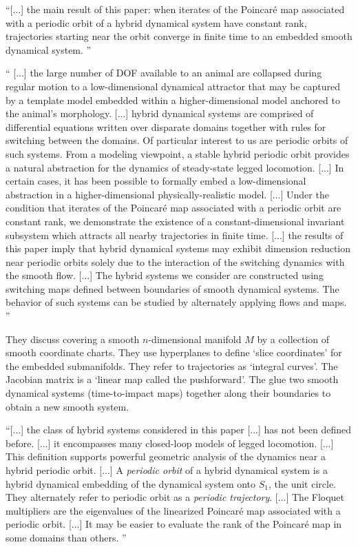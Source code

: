 \begin{description}
``[...]
the main result of this paper: when
iterates of the Poincar\'e map associated with a periodic orbit
of a hybrid dynamical system have constant rank, trajectories
starting near the orbit converge in finite time to an embedded
smooth dynamical system.
''

``
[...]
the large number of DOF available to an animal are collapsed
during regular motion to a low-dimensional dynamical attractor
that may be captured by a template model embedded
within a higher-dimensional model anchored to the animal's
morphology.
[...]
hybrid
dynamical systems are comprised of differential equations
written over disparate domains together with rules for switching
between the domains. Of particular interest to us are
periodic orbits of such systems. From a modeling viewpoint,
a stable hybrid periodic orbit provides a natural abstraction
for the dynamics of steady-state legged locomotion.
[...]
In certain cases, it has
been possible to formally embed a low-dimensional abstraction
in a higher-dimensional physically-realistic model.
[...]
Under the condition that iterates of the Poincar\'e
map associated with a periodic orbit are constant rank,
we demonstrate the existence of a constant-dimensional
invariant subsystem which attracts all nearby trajectories in
finite time.
[...]
the results of this paper
imply that hybrid dynamical systems may exhibit dimension
reduction near periodic orbits solely due to the interaction
of the switching dynamics with the smooth flow.
[...]
The hybrid systems we consider are constructed using
switching maps defined between boundaries of smooth dynamical
systems. The behavior of such systems can be
studied by alternately applying flows and maps.
''

                                                \toCB
They discuss covering a smooth $n$-dimensional manifold $M$ by a
collection of smooth coordinate charts. They use hyperplanes to define
`slice coordinates' for the embedded submanifolds. They refer to
trajectories as `integral curves'. The Jacobian matrix is a `linear map
called the pushforward'. The glue two smooth dynamical systems
(time-to-impact maps) together along their boundaries to obtain a new
smooth system.


``[...]
the class of hybrid systems considered in this paper
[...]
has not been defined before.
[...]
it encompasses many closed-loop models of legged locomotion.
[...]
This definition supports powerful geometric analysis of the dynamics near
a hybrid periodic orbit.
[...]
A \emph{periodic orbit} of a hybrid dynamical system is a hybrid
dynamical embedding  of the dynamical system onto $S_1$, the unit circle.
                                                \toCB
They alternately refer to {periodic orbit} as a \emph{periodic trajectory}.
[...]
The Floquet multipliers are the eigenvalues of the linearized
Poincar\'e map associated with a periodic orbit.
[...]
It may be easier to evaluate the rank of the Poincar\'e map in some
domains than others.
''


\end{description}
